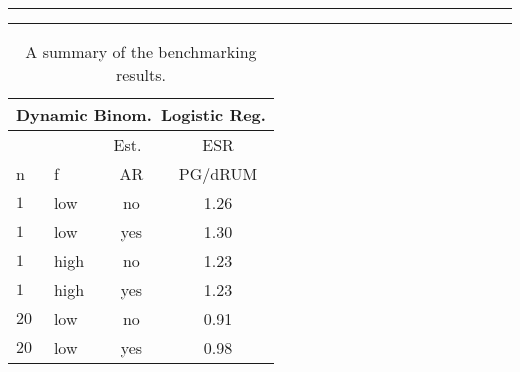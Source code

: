 \documentclass[12pt]{article}
\begin{document}
\begin{table}

  \begin{center}
    \caption{\label{tab:benchmark-summary} A summary of the benchmarking results.}
    \hrule
    \vspace{2pt}
    \hrule
  \end{center}
  \begin{center}
    \small
    \begin{tabular}{l l c c}
      \multicolumn{4}{c}{Dynamic Binom.\ Logistic Reg.} \\
      \hline
      & & Est.\ & ESR \\
      n & f & AR & PG/dRUM \\
      \hline
      $1$ & low & no & 1.26 \\
      $1$ & low & yes & 1.30 \\

      $1$ & high & no & 1.23 \\
      $1$ & high & yes & 1.23 \\

      $20$ & low & no & 0.91 \\
      $20$ & low & yes & 0.98 \\


\end{tabular}
\end{center}
\end{table}
\end{document}
